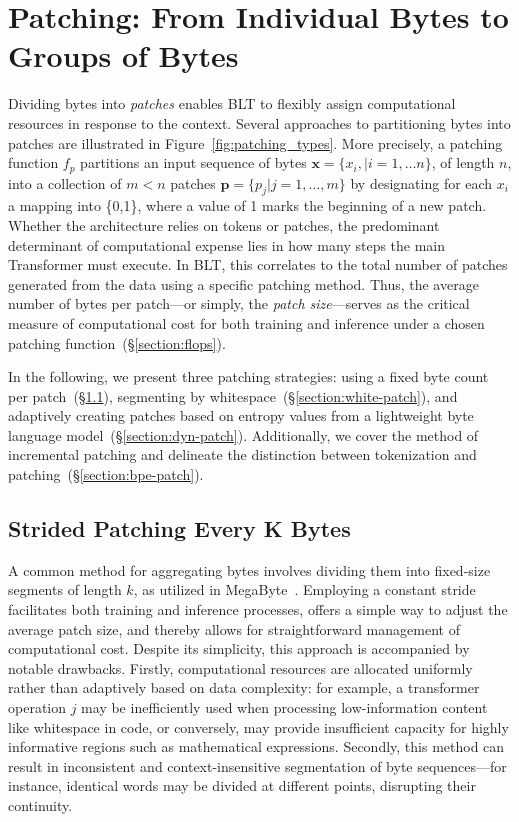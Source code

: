 \section{Patching: From Individual Bytes to Groups of Bytes}
\label{section:patching}

Dividing bytes into \textit{patches} enables {\textsc BLT} to flexibly assign computational resources in response to the context. Several approaches to partitioning bytes into patches are illustrated in Figure~\ref{fig:patching_types}. More precisely, a patching function $f_p$ partitions an input sequence of bytes $\pmb{x}=\{x_i,|i=1,\ldots n\}$, of length $n$, into a collection of $m < n$ patches $\pmb{p}=\{p_j|j=1,\ldots,m\}$ by designating for each $x_i$ a mapping into \{0,1\}, where a value of 1 marks the beginning of a new patch. Whether the architecture relies on tokens or patches, the predominant determinant of computational expense lies in how many steps the main Transformer must execute. In {\textsc BLT}, this correlates to the total number of patches generated from the data using a specific patching method. Thus, the average number of bytes per patch—or simply, the \textit{patch size}—serves as the critical measure of computational cost for both training and inference under a chosen patching function~(\S\ref{section:flops}).

In the following, we present three patching strategies: using a fixed byte count per patch~(\S\ref{section:static-patch}), segmenting by whitespace~(\S\ref{section:white-patch}), and adaptively creating patches based on entropy values from a lightweight byte language model~(\S\ref{section:dyn-patch}). Additionally, we cover the method of incremental patching and delineate the distinction between tokenization and patching~(\S\ref{section:bpe-patch}).

\subsection{Strided Patching Every K Bytes}
\label{section:static-patch}

A common method for aggregating bytes involves dividing them into fixed-size segments of length $k$, as utilized in MegaByte~\citep{yu2023megabyte}. Employing a constant stride facilitates both training and inference processes, offers a simple way to adjust the average patch size, and thereby allows for straightforward management of computational cost. Despite its simplicity, this approach is accompanied by notable drawbacks. Firstly, computational resources are allocated uniformly rather than adaptively based on data complexity: for example, a transformer operation $j$ may be inefficiently used when processing low-information content like whitespace in code, or conversely, may provide insufficient capacity for highly informative regions such as mathematical expressions. Secondly, this method can result in inconsistent and context-insensitive segmentation of byte sequences—for instance, identical words may be divided at different points, disrupting their continuity.

